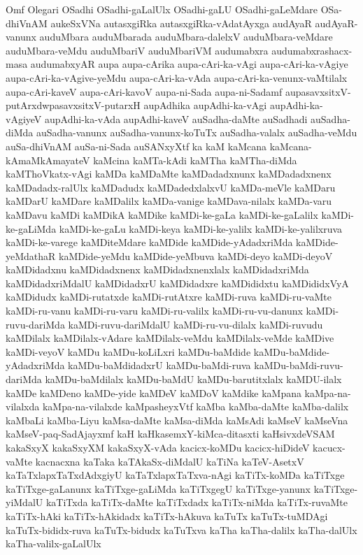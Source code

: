{Omf
Olegari
OSadhi
OSadhi-gaLalUlx
OSadhi-gaLU
OSadhi-gaLeMdare
OSa-dhiVnAM
aukeSxVNa
autasxgiRka
autasxgiRka-vAdatAyxga
audAyaR
audAyaR-vanunx
auduMbara
auduMbarada
auduMbara-dalelxV
auduMbara-veMdare
auduMbara-veMdu
auduMbariV
auduMbariVM
audumabxra
audumabxrashacx-masa
audumabxyAR
aupa
aupa-cArika
aupa-cAri-ka-vAgi
aupa-cAri-ka-vAgiye
aupa-cAri-ka-vAgive-yeMdu
aupa-cAri-ka-vAda
aupa-cAri-ka-venunx-vaMtilalx
aupa-cAri-kaveV
aupa-cAri-kavoV
aupa-ni-Sada
aupa-ni-Sadamf
aupasavxsitxV-putArxdwpasavxsitxV-putarxH
aupAdhika
aupAdhi-ka-vAgi
aupAdhi-ka-vAgiyeV
aupAdhi-ka-vAda
aupAdhi-kaveV
auSadha-daMte
auSadhadi
auSadha-diMda
auSadha-vanunx
auSadha-vanunx-koTuTx
auSadha-valalx
auSadha-veMdu
auSa-dhiVnAM
auSa-ni-Sada
auSANxyXtf
ka
kaM
kaMcana
kaMcana-kAmaMkAmayateV
kaMcina
kaMTa-kAdi
kaMTha
kaMTha-diMda
kaMThoVkatx-vAgi
kaMDa
kaMDaMte
kaMDadadxnunx
kaMDadadxnenx
kaMDadadx-ralUlx
kaMDadudx
kaMDadedxlalxvU
kaMDa-meVle
kaMDaru
kaMDarU
kaMDare
kaMDalilx
kaMDa-vanige
kaMDava-nilalx
kaMDa-varu
kaMDavu
kaMDi
kaMDikA
kaMDike
kaMDi-ke-gaLa
kaMDi-ke-gaLalilx
kaMDi-ke-gaLiMda
kaMDi-ke-gaLu
kaMDi-keya
kaMDi-ke-yalilx
kaMDi-ke-yalilxruva
kaMDi-ke-varege
kaMDiteMdare
kaMDide
kaMDide-yAdadxriMda
kaMDide-yeMdathaR
kaMDide-yeMdu
kaMDide-yeMbuva
kaMDi-deyo
kaMDi-deyoV
kaMDidadxnu
kaMDidadxnenx
kaMDidadxnenxlalx
kaMDidadxriMda
kaMDidadxriMdalU
kaMDidadxrU
kaMDidadxre
kaMDididxtu
kaMDididxVyA
kaMDidudx
kaMDi-rutatxde
kaMDi-rutAtxre
kaMDi-ruva
kaMDi-ru-vaMte
kaMDi-ru-vanu
kaMDi-ru-varu
kaMDi-ru-valilx
kaMDi-ru-vu-danunx
kaMDi-ruvu-dariMda
kaMDi-ruvu-dariMdalU
kaMDi-ru-vu-dilalx
kaMDi-ruvudu
kaMDilalx
kaMDilalx-vAdare
kaMDilalx-veMdu
kaMDilalx-veMde
kaMDive
kaMDi-veyoV
kaMDu
kaMDu-koLiLxri
kaMDu-baMdide
kaMDu-baMdide-yAdadxriMda
kaMDu-baMdidadxrU
kaMDu-baMdi-ruva
kaMDu-baMdi-ruvu-dariMda
kaMDu-baMdilalx
kaMDu-baMdU
kaMDu-barutitxlalx
kaMDU-ilalx
kaMDe
kaMDeno
kaMDe-yide
kaMDeV
kaMDoV
kaMdike
kaMpana
kaMpa-na-vilalxda
kaMpa-na-vilalxde
kaMpasheyxVtf
kaMba
kaMba-daMte
kaMba-dalilx
kaMbaLi
kaMba-Liyu
kaMsa-daMte
kaMsa-diMda
kaMsAdi
kaMseV
kaMseVna
kaMseV-paq-SadAjayxmf
kaH
kaHkasemxY-kiMca-ditasxti
kaHsivxdeVSAM
kakaSxyX
kakaSxyXM
kakaSxyX-vAda
kacicx-koMDu
kacicx-hiDideV
kacucx-vaMte
kacnacxna
kaTaka
kaTAkaSx-diMdalU
kaTiNa
kaTeV-AsetxV
kaTaTxlapxTaTxdAdxgiyU
kaTaTxlapxTaTxva-nAgi
kaTiTx-koMDa
kaTiTxge
kaTiTxge-gaLanunx
kaTiTxge-gaLiMda
kaTiTxgegU
kaTiTxge-yanunx
kaTiTxge-yiMdalU
kaTiTxda
kaTiTx-daMte
kaTiTxdadx
kaTiTx-niMda
kaTiTx-ruvaMte
kaTiTx-hAki
kaTiTx-hAkidadx
kaTiTx-hAkuva
kaTuTx
kaTuTx-tuMDAgi
kaTuTx-bididx-ruva
kaTuTx-bidudx
kaTuTxva
kaTha
kaTha-dalilx
kaTha-dalUlx
kaTha-valilx-gaLalUlx
}

